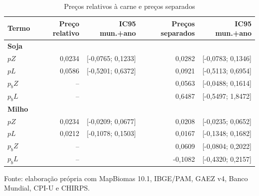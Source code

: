 \begin{table}[htbp]
\centering
\footnotesize
\setlength{\tabcolsep}{3pt}
\renewcommand{\arraystretch}{1.1}
\normalcaption\captionstyle{\centering}
\caption{Preços relativos à carne e preços separados}
\label{tab:h1-precos-etapa9}
\begin{tabular}{lrrrr}
\hline
Termo & Preço relativo & IC95 mun.+ano & Preços separados & IC95 mun.+ano \\
\hline\multicolumn{5}{l}{\textbf{Soja}} \\
$pZ$ & 0,0234 & [-0,0765; 0,1233] & 0,0282 & [-0,0783; 0,1346] \\
$pL$ & 0,0586 & [-0,5201; 0,6372] & 0,0921 & [-0,5113; 0,6954] \\
$p_bZ$ & -- &  & 0,0563 & [-0,0488; 0,1614] \\
$p_bL$ & -- &  & 0,6487 & [-0,5497; 1,8472] \\
\hline\multicolumn{5}{l}{\textbf{Milho}} \\
$pZ$ & 0,0234 & [-0,0209; 0,0677] & 0,0208 & [-0,0235; 0,0652] \\
$pL$ & 0,0212 & [-0,1078; 0,1503] & 0,0167 & [-0,1348; 0,1682] \\
$p_bZ$ & -- &  & 0,0609 & [-0,0804; 0,2022] \\
$p_bL$ & -- &  & -0,1082 & [-0,4320; 0,2157] \\
\hline\end{tabular}
\par\smallskip
\begin{minipage}{\textwidth}\footnotesize\centering
Fonte: elaboração própria com MapBiomas 10.1, IBGE/PAM, GAEZ v4, Banco Mundial, CPI-U e CHIRPS.
\end{minipage}
\end{table}

